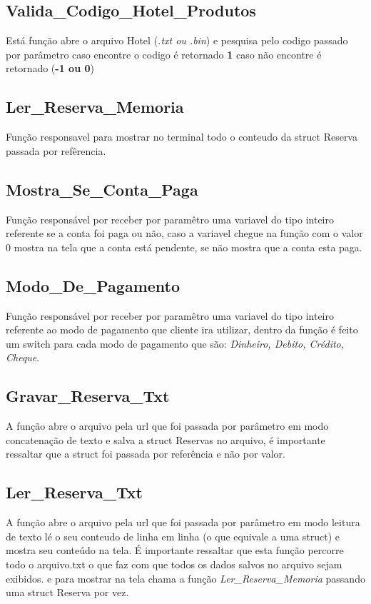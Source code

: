 \documentclass{article}
\begin{document}
\subsection{Valida\_Codigo\_Hotel\_Produtos}
	Está função  abre o arquivo Hotel (\textit{.txt ou .bin}) e pesquisa pelo codigo passado por parâmetro caso encontre o codigo é retornado \textbf{1} caso  não encontre é retornado (\textbf{-1 ou 0})

\subsection{Ler\_Reserva\_Memoria}	
	Função responsavel para mostrar no terminal todo o conteudo da struct Reserva passada por  refêrencia.
	
\subsection{Mostra\_Se\_Conta\_Paga}	
	Função responsável por receber por paramêtro uma variavel do tipo inteiro referente se a conta foi paga ou não, caso a variavel chegue na função com o valor 0 mostra na tela que a conta está pendente, se não mostra que a conta esta paga.
	
\subsection{Modo\_De\_Pagamento}	
	Função responsável por receber por paramêtro uma variavel do tipo inteiro referente ao modo de pagamento que cliente ira utilizar, dentro da função é feito um switch para cada modo de pagamento que são: \textit{Dinheiro, Debito, Crédito, Cheque}.
	
\subsection{Gravar\_Reserva\_Txt}	
	A função abre o arquivo pela url que foi passada por parâmetro em modo concatenação de texto e salva a struct Reservas  no arquivo, é importante ressaltar que  a struct foi passada por referência e não por valor.
	
\subsection{Ler\_Reserva\_Txt}
	A função abre o arquivo pela url que foi passada por parâmetro em modo leitura de texto lé o seu conteudo de linha em linha (o que equivale a uma struct) e mostra seu conteúdo na tela. É importante ressaltar que esta função percorre todo o arquivo.txt o que faz com que todos os dados salvos no arquivo sejam exibidos. e para mostrar na tela chama a função \textit{Ler\_Reserva\_Memoria} passando uma struct Reserva  por vez.
	
\end{document}
